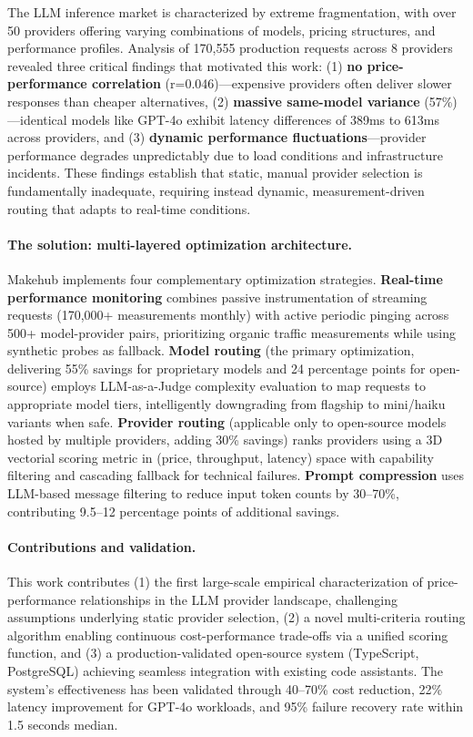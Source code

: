 \documentclass[english]{article}
\begin{document}
The LLM inference market is characterized by extreme fragmentation, with over 50 providers offering varying combinations of models, pricing structures, and performance profiles. Analysis of 170,555 production requests across 8 providers revealed three critical findings that motivated this work: (1) \textbf{no price-performance correlation} (r=0.046)—expensive providers often deliver slower responses than cheaper alternatives, (2) \textbf{massive same-model variance} (57\%)—identical models like GPT-4o exhibit latency differences of 389ms to 613ms across providers, and (3) \textbf{dynamic performance fluctuations}—provider performance degrades unpredictably due to load conditions and infrastructure incidents. These findings establish that static, manual provider selection is fundamentally inadequate, requiring instead dynamic, measurement-driven routing that adapts to real-time conditions.

\paragraph{The solution: multi-layered optimization architecture.}

Makehub implements four complementary optimization strategies. \textbf{Real-time performance monitoring} combines passive instrumentation of streaming requests (170,000+ measurements monthly) with active periodic pinging across 500+ model-provider pairs, prioritizing organic traffic measurements while using synthetic probes as fallback. \textbf{Model routing} (the primary optimization, delivering 55\% savings for proprietary models and 24 percentage points for open-source) employs LLM-as-a-Judge complexity evaluation to map requests to appropriate model tiers, intelligently downgrading from flagship to mini/haiku variants when safe. \textbf{Provider routing} (applicable only to open-source models hosted by multiple providers, adding 30\% savings) ranks providers using a 3D vectorial scoring metric in (price, throughput, latency) space with capability filtering and cascading fallback for technical failures. \textbf{Prompt compression} uses LLM-based message filtering to reduce input token counts by 30--70\%, contributing 9.5--12 percentage points of additional savings.

\paragraph{Contributions and validation.}

This work contributes (1) the first large-scale empirical characterization of price-performance relationships in the LLM provider landscape, challenging assumptions underlying static provider selection, (2) a novel multi-criteria routing algorithm enabling continuous cost-performance trade-offs via a unified scoring function, and (3) a production-validated open-source system (TypeScript, PostgreSQL) achieving seamless integration with existing code assistants. The system's effectiveness has been validated through 40--70\% cost reduction, 22\% latency improvement for GPT-4o workloads, and 95\% failure recovery rate within 1.5 seconds median.
\end{document}
